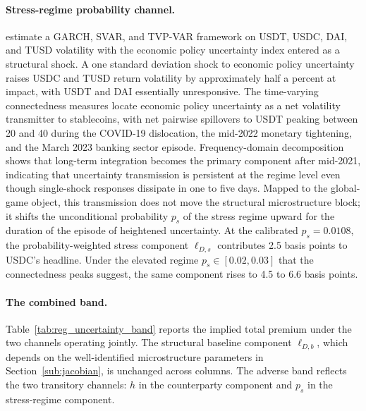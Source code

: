 \paragraph{Stress-regime probability channel.} \citet{alasadi_bewaji_gugnani_gupta_heijmans_2025} estimate a GARCH, SVAR, and TVP-VAR framework on USDT, USDC, DAI, and TUSD volatility with the \citet{baker_bloom_davis_2016} economic policy uncertainty index entered as a structural shock. A one standard deviation shock to economic policy uncertainty raises USDC and TUSD return volatility by approximately half a percent at impact, with USDT and DAI essentially unresponsive. The time-varying connectedness measures locate economic policy uncertainty as a net volatility transmitter to stablecoins, with net pairwise spillovers to USDT peaking between 20 and 40 during the COVID-19 dislocation, the mid-2022 monetary tightening, and the March 2023 banking sector episode. Frequency-domain decomposition shows that long-term integration becomes the primary component after mid-2021, indicating that uncertainty transmission is persistent at the regime level even though single-shock responses dissipate in one to five days. Mapped to the global-game object, this transmission does not move the structural microstructure block; it shifts the unconditional probability $p_s$ of the stress regime upward for the duration of the episode of heightened uncertainty. At the calibrated $p_s = 0.0108$, the probability-weighted stress component $\ell_{D,s}$ contributes 2.5 basis points to USDC's headline. Under the elevated regime $p_s \in [0.02, 0.03]$ that the connectedness peaks suggest, the same component rises to 4.5 to 6.6 basis points.

\paragraph{The combined band.} Table~\ref{tab:reg_uncertainty_band} reports the implied total premium under the two channels operating jointly. The structural baseline component $\ell_{D,b}$, which depends on the well-identified microstructure parameters in Section~\ref{sub:jacobian}, is unchanged across columns. The adverse band reflects the two transitory channels: $h$ in the counterparty component and $p_s$ in the stress-regime component.


